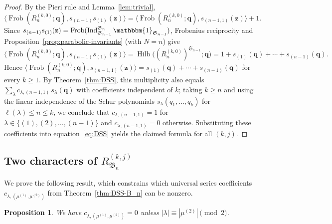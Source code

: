 \documentclass[12pt]{amsart}
\theoremstyle{plain}
\newtheorem{proposition}[theorem]{Proposition}
\theoremstyle{definition}
\DeclareMathOperator{\Frob}{Frob}
\DeclareMathOperator{\Hilb}{Hilb}
\DeclareMathOperator{\Ind}{Ind}
\newcommand{\z}{\mathbf{z}}
\begin{document}
\begin{proof}
    By the Pieri rule and Lemma~\ref{lem:trivial},
    \begin{equation}
        \langle \Frob(R_n^{(k,0)}; \mathbf{q}), s_{(n-1)}s_{(1)} (\z)\rangle
        = \langle \Frob(R_n^{(k,0)}; \mathbf{q}), s_{(n-1,1)} (\z)\rangle + 1.
    \end{equation}
    Since $s_{(n-1)}s_{(1)}(\z) = \Frob(\Ind_{\mathfrak{S}_{n-1}}^{\mathfrak{S}_n} \mathbbm{1}_{\mathfrak{S}_{n-1}})$, Frobenius reciprocity and Proposition~\ref{prop:parabolic-invariants} (with $N = n$) give
    \begin{equation}
        \langle \Frob(R_n^{(k,0)}; \mathbf{q}), s_{(n-1)}s_{(1)} (\z)\rangle
        = \Hilb\big((R_n^{(k,0)})^{\mathfrak{S}_{n-1}}; \mathbf{q}\big)
        = 1 + s_{(1)}(\mathbf{q}) + \cdots + s_{(n-1)}(\mathbf{q}).
    \end{equation}
    Hence $\langle \Frob(R_n^{(k,0)}; \mathbf{q}), s_{(n-1,1)} (\z)\rangle = s_{(1)}(\mathbf{q}) + \cdots + s_{(n-1)}(\mathbf{q})$ for every $k \geq 1$. 
    By Theorem~\ref{thm:DSS}, this multiplicity also equals $\sum_{\lambda} c_{\lambda,(n-1,1)}\, s_\lambda(\mathbf{q})$ with coefficients independent of $k$; taking $k \geq n$ and using the linear independence of the Schur polynomials $s_\lambda(q_1,\ldots,q_k)$ for $\ell(\lambda) \leq n \leq k$, we conclude that $c_{\lambda,(n-1,1)} = 1$ for $\lambda \in \{(1), (2), \ldots, (n-1)\}$ and $c_{\lambda,(n-1,1)} = 0$ otherwise. 
    Substituting these coefficients into equation~\eqref{eq:DSS} yields the claimed formula for all $(k,j)$.
\end{proof}

\subsection{Two characters of \texorpdfstring{$R_{\mathfrak{B}_n}^{(k,j)}$}{RBn(k,j)}}\label{subsec:standard-B_n}

We prove the following result, which constrains which universal series coefficients $c_{\lambda,(\mu^{(1)},\mu^{(2)})}$ from Theorem~\ref{thm:DSS-B_n} can be nonzero.

\begin{proposition}\label{prop:parity}
    We have $c_{\lambda,(\mu^{(1)},\mu^{(2)})} = 0$ unless $|\lambda| \equiv |\mu^{(2)}| \pmod{2}$.
\end{proposition}
\end{document}
